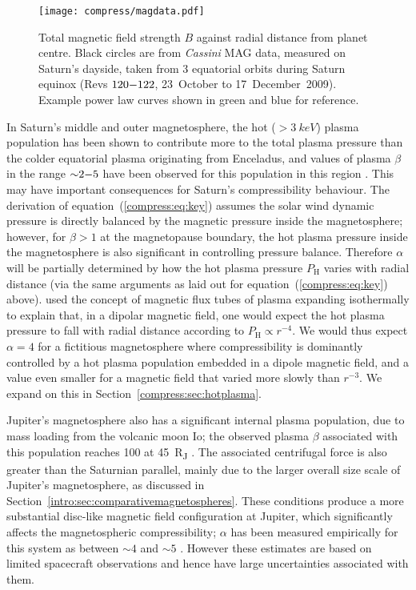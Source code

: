 \begin{figure}
\centering
\noindent\texttt{[image: compress/magdata.pdf]}
\caption[Equatorial magnetic field data from \textit{Cassini} MAG.]{Total magnetic field strength $B$ against radial distance from planet centre. Black circles are from \textit{Cassini} MAG data, measured on Saturn's dayside, taken from 3 equatorial orbits during Saturn equinox (Revs $120{\--}122$, 23~October to 17~December~2009). Example power law curves shown in green and blue for reference.}
\label{compress:fig:magdata}
\end{figure}

In Saturn's middle and outer magnetosphere, the hot ($>\SI{3}{keV}$) plasma population has been shown to contribute more to the total plasma pressure than the colder equatorial plasma originating from Enceladus, and values of plasma $\beta$ in the range ${\sim}2{\--}5$ have been observed for this population in this region \citep{sergis2010}. This may have important consequences for Saturn's compressibility behaviour. The derivation of equation~(\ref{compress:eq:key}) assumes the solar wind dynamic pressure is directly balanced by the magnetic pressure inside the magnetosphere; however, for $\beta > 1$ at the magnetopause boundary, the hot plasma pressure inside the magnetosphere is also significant in controlling pressure balance. Therefore $\alpha$ will be partially determined by how the hot plasma pressure $P_\mathrm{H}$ varies with radial distance (via the same arguments as laid out for equation~(\ref{compress:eq:key}) above). \citet{gold1959} used the concept of magnetic flux tubes of plasma expanding isothermally to explain that, in a dipolar magnetic field, one would expect the hot plasma pressure to fall with radial distance according to $P_\mathrm{H} \propto r^{-4}$. We would thus expect $\alpha = 4$ for a fictitious magnetosphere where compressibility is dominantly controlled by a hot plasma population embedded in a dipole magnetic field, and a value even smaller for a magnetic field that varied more slowly than $r^{-3}$. We expand on this in Section~\ref{compress:sec:hotplasma}.

Jupiter's magnetosphere also has a significant internal plasma population, due to mass loading from the volcanic moon Io; the observed plasma $\beta$ associated with this population reaches 100 at \SI{45}{R_J} \citep{mauk2004}. The associated centrifugal force is also greater than the Saturnian parallel, mainly due to the larger overall size scale of Jupiter's magnetosphere, as discussed in Section~\ref{intro:sec:comparativemagnetospheres}. These conditions produce a more substantial disc-like magnetic field configuration at Jupiter, which significantly affects the magnetospheric compressibility; $\alpha$ has been measured empirically for this system as between ${\sim}4$ and ${\sim}5$ \citep{huddleston1998, joy2002, alexeev2005}. However these estimates are based on limited spacecraft observations and hence have large uncertainties associated with them.

